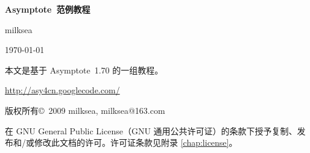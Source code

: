 \documentclass[cs4size,oneside,openany]{ctexbook}
\newcommand*\Asy{\textsf{Asymptote}}
\newcommand*\asyversion{1.70}
\begin{document}
\frontmatter

\begin{titlepage}
\begin{center}
  {\bfseries
  \Asy\ 范例教程}
\bigskip

  {\sffamily
  milksea}
\bigskip

  {\today}
\end{center}
\end{titlepage}

\begingroup
\setlength{\parindent}{0pt}
本文是基于 \Asy\ \asyversion{} 的一组教程。

\url{http://asy4cn.googlecode.com/}
\medskip

版权所有\copyright\ 2009 milksea, milksea@163.com

{\setlength{\leftskip}{2em}
在 GNU General Public License（GNU 通用公共许可证）的条款下授予复制、发布和/或修改此文档的许可。许可证条款见附录 \ref{chap:license}。\par}
\endgroup
\newpage

\mainmatter



\appendix


\printindex



\end{document}
